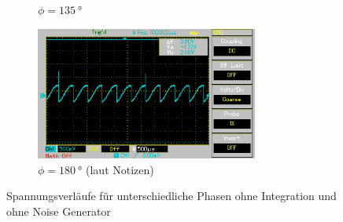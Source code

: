 \begin{figure}[H]
\begin{subfigure}{0.5\textwidth}
    \caption{$\phi = \qty[]{135}{\degree}$}%
    \label{fig:phase4}%
    \end{subfigure}%
    \hfill
    \begin{subfigure}{0.5\textwidth}%
    \centering%
    \includegraphics[width = 7.3cm]{./Oszilloskop Bilder/png/5.2/5 MAP006.png}%
    \caption{$\phi = \qty[]{180}{\degree}$  (laut Notizen)}%
    \label{fig:phase5}%
    \end{subfigure}%
    \caption{Spannungsverläufe für unterschiedliche Phasen ohne Integration und ohne Noise Generator}%
    \label{fig:phasenunterschiede_ohne_noise}%
\end{figure}%
%  
%
%
